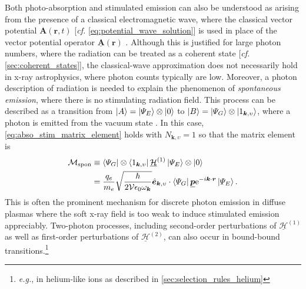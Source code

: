 Both photo-absorption and stimulated emission can also be understood as arising from the presence of a classical electromagnetic wave, where the classical vector potential $\mathbold{A} ( \mathbold{r} , t)$ [\emph{cf.\@} \cref{eq:potential_wave_solution}] is used in place of the vector potential operator $\underline{\mathbold{A}} ( \mathbold{r} )$ \cite[\emph{cf.\@} \cref{eq:vector_potential_operator_fixedtime}]{Rybicki86,Shankar04}. 
Although this is justified for large photon numbers, where the radiation can be treated as a coherent state [\emph{cf.\@} \cref{sec:coherent_states}], the classical-wave approximation does not necessarily hold in x-ray astrophysics, where photon counts typically are low. 
Moreover, a photon description of radiation is needed to explain the phenomenon of \emph{spontaneous emission}, where there is no stimulating radiation field. 
This process can be described as a transition from $\ket{A} = \ket{\Psi_E} \otimes \ket{0}$ to $\ket{B} = \ket{\Psi_G} \otimes \ket{1_{\mathbold{k},\upsilon}}$, where a photon is emitted from the vacuum state \cite{Fontana_82,Townsend00,Shankar04}. 
In this case, \cref{eq:abso_stim_matrix_element} holds with $N_{\mathbold{k},\upsilon} = 1$ so that the matrix element is
\begin{align}\label{eq:emission_matrix_element}
 \begin{split}
 \mathcal{M}_{\text{spon}} &\equiv \bra{\Psi_G} \otimes \bra{1_{\mathbold{k},\upsilon}} \underline{\mathcal{H}}^{(1)} \ket{\Psi_E} \otimes \ket{0} \\
 &= \frac{q_e}{m_e} \sqrt{\frac{\hbar}{2 \mathcal{V} \epsilon_0 \omega_{\mathbold{k}}}} \hat{\mathbold{e}}_{\mathbold{k},\upsilon} \cdot \bra{\Psi_G} \underline{\mathbold{p}} \mathrm{e}^{-i \mathbold{k} \cdot \mathbold{r}} \ket{\Psi_E}  .
 \end{split}
 \end{align}
This is often the prominent mechanism for discrete photon emission in diffuse plasmas where the soft x-ray field is too weak to induce stimulated emission appreciably. 
Two-photon processes, including second-order perturbations of $\underline{\mathcal{H}}^{(1)}$ as well as first-order perturbations of $\underline{\mathcal{H}}^{(2)}$, can also occur in bound-bound transitions.\footnote{\emph{e.g.}, in helium-like ions as described in \cref{sec:selection_rules_helium}} 
